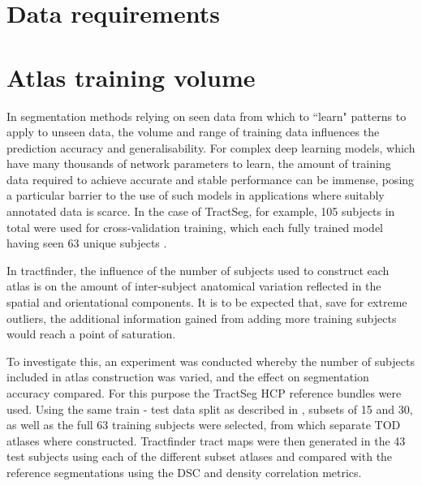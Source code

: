 \section{Data requirements}


\section{Atlas training volume}

In segmentation methods relying on seen data from which to ``learn" patterns to apply to unseen data, the volume and range of training data influences the prediction accuracy and generalisability. 
For complex deep learning models, which have many thousands of network parameters to learn, the amount of training data required to achieve accurate and stable performance can be immense, posing a particular barrier to the use of such models in applications where suitably annotated data is scarce.
In the case of TractSeg, for example, 105 subjects in total were used for cross-validation training, which each fully trained model having seen 63 unique subjects .

In tractfinder, the influence of the number of subjects used to construct each atlas is on the amount of inter-subject anatomical variation reflected in the spatial and orientational components.
It is to be expected that, save for extreme outliers, the additional information gained from adding more training subjects would reach a point of saturation.

To investigate this, an experiment was conducted whereby the number of subjects included in atlas construction was varied, and the effect on segmentation accuracy compared.
For this purpose the TractSeg HCP reference bundles were used.
Using the same train - test data split as described in , subsets of 15 and 30, as well as the full 63 training subjects were selected, from which separate TOD atlases where constructed.
Tractfinder tract maps were then generated in the 43 test subjects using each of the different subset atlases and compared with the reference segmentations using the DSC and density correlation metrics.
